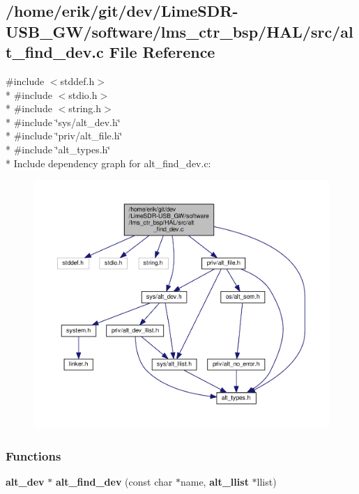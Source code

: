 \subsection{/home/erik/git/dev/\+Lime\+S\+D\+R-\/\+U\+S\+B\+\_\+\+G\+W/software/lms\+\_\+ctr\+\_\+bsp/\+H\+A\+L/src/alt\+\_\+find\+\_\+dev.c File Reference}
\label{alt__find__dev_8c}
{\ttfamily \#include $<$stddef.\+h$>$}\\*
{\ttfamily \#include $<$stdio.\+h$>$}\\*
{\ttfamily \#include $<$string.\+h$>$}\\*
{\ttfamily \#include \char`\"{}sys/alt\+\_\+dev.\+h\char`\"{}}\\*
{\ttfamily \#include \char`\"{}priv/alt\+\_\+file.\+h\char`\"{}}\\*
{\ttfamily \#include \char`\"{}alt\+\_\+types.\+h\char`\"{}}\\*
Include dependency graph for alt\+\_\+find\+\_\+dev.\+c\+:
\nopagebreak
\begin{figure}[H]
\begin{center}
\leavevmode
\includegraphics[width=350pt]{dc/de8/alt__find__dev_8c__incl}
\end{center}
\end{figure}
\subsubsection*{Functions}
\begin{DoxyCompactItemize}
\item 
{\bf alt\+\_\+dev} $\ast$ {\bf alt\+\_\+find\+\_\+dev} (const char $\ast$name, {\bf alt\+\_\+llist} $\ast$llist)
\end{DoxyCompactItemize}


